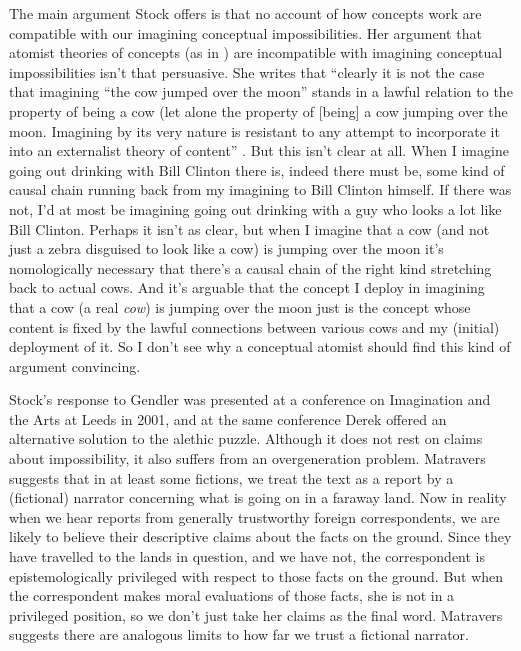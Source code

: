 The main argument Stock offers is that no account of how concepts work are compatible with our imagining conceptual impossibilities. Her argument that atomist theories of concepts (as in \citet{Fodor1998}) are incompatible with imagining conceptual impossibilities isn't that persuasive. She writes that ``clearly it is not the case that imagining ``the cow jumped over the moon'' stands in a lawful relation to the property of being a cow (let alone the property of [being] a cow jumping over the moon. Imagining by its very nature is resistant to any attempt to incorporate it into an externalist theory of content'' \citeyearpar[114]{Stock2003}. But this isn't clear at all. When I imagine going out drinking with Bill Clinton there is, indeed there must be, some kind of causal chain running back from my imagining to Bill Clinton himself. If there was not, I'd at most be imagining going out drinking with a guy who looks a lot like Bill Clinton. Perhaps it isn't as clear, but when I imagine that a cow (and not just a zebra disguised to look like a cow) is jumping over the moon it's nomologically necessary that there's a causal chain of the right kind stretching back to actual cows. And it's arguable that the concept I deploy in imagining that a cow (a real \textit{cow}) is jumping over the moon just is the concept whose content is fixed by the lawful connections between various cows and my (initial) deployment of it. So I don't see why a conceptual atomist should find this kind of argument convincing.

Stock's response to Gendler was presented at a conference on Imagination and the Arts at Leeds in 2001, and at the same conference Derek \citet{Matravers2003} offered an alternative solution to the alethic puzzle. Although it does not rest on claims about impossibility, it also suffers from an overgeneration problem. Matravers suggests that in at least some fictions, we treat the text as a report by a (fictional) narrator concerning what is going on in a faraway land. Now in reality when we hear reports from generally trustworthy foreign correspondents, we are likely to believe their descriptive claims about the facts on the ground. Since they have travelled to the lands in question, and we have not, the correspondent is epistemologically privileged with respect to those facts on the ground. But when the correspondent makes moral evaluations of those facts, she is not in a privileged position, so we don't just take her claims as the final word. Matravers suggests there are analogous limits to how far we trust a fictional narrator.

